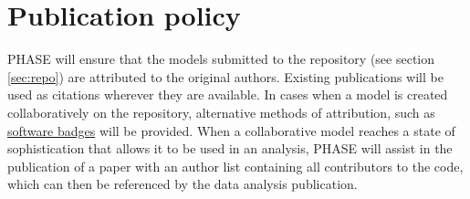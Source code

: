 \section{Publication policy}
\label{sec:publications}
PHASE will ensure that the models submitted to the repository (see section \ref{sec:repo}) are attributed to the original authors. Existing publications will be used as citations wherever they are available. In cases when a model is created collaboratively on the repository, alternative methods of attribution, such as \href{http://openbadges.org}{software badges} will be provided. When a collaborative model reaches a state of sophistication that allows it to be used in an analysis, PHASE will assist in the publication of a paper with an author list containing all contributors to the code, which can then be referenced by the data analysis publication.

